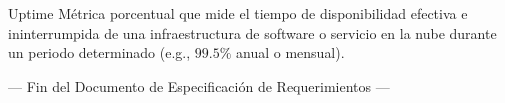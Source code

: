 \documentclass[11pt,a4paper]{article}
\begin{document}
\begin{GlossaryBox}{Uptime}
    Métrica porcentual que mide el tiempo de disponibilidad efectiva e ininterrumpida de una infraestructura de software o servicio en la nube durante un periodo determinado (e.g., $99.5\%$ anual o mensual).
\end{GlossaryBox}

\vspace{0.8cm}
\begin{center}
    \small\sffamily\textcolor{MutedText}{--- Fin del Documento de Especificación de Requerimientos ---}
\end{center}
\end{document}
